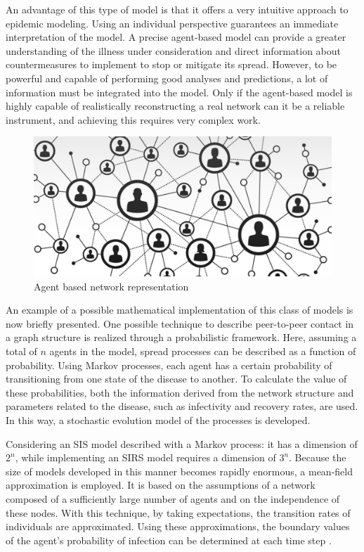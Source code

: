 An advantage of this type of model is that it offers a very intuitive approach to epidemic modeling. Using an individual perspective guarantees an immediate interpretation of the model. A precise agent-based model can provide a greater understanding of the illness under consideration and direct information about countermeasures to implement to stop or mitigate its spread. However, to be powerful and capable of performing good analyses and predictions, a lot of information must be integrated into the model. Only if the agent-based model is highly capable of realistically reconstructing a real network can it be a reliable instrument, and achieving this requires very complex work.
\begin{figure}
	\centering
	\includegraphics[width=0.5\linewidth]{0_introduction/images_introduction/agent_based}
	\caption[Agent based network representation]{Agent based network representation}
	\label{fig:agentbased}
\end{figure}


An example of a possible mathematical implementation of this class of models is now briefly presented. One possible technique to describe peer-to-peer contact in a graph structure is realized through a probabilistic framework. Here, assuming a total of $n$ agents in the model, spread processes can be described as a function of probability. Using Markov processes, each agent has a certain probability of transitioning from one state of the disease to another. To calculate the value of these probabilities, both the information derived from the network structure and parameters related to the disease, such as infectivity and recovery rates, are used. In this way, a stochastic evolution model of the processes is developed.

Considering an SIS model described with a Markov process: it has a dimension of $2^n$, while implementing an SIRS model requires a dimension of $3^n$. Because the size of models developed in this manner becomes rapidly enormous, a mean-field approximation is employed. It is based on the assumptions of a network composed of a sufficiently large number of agents and on the independence of these nodes. With this technique, by taking expectations, the transition rates of individuals are approximated. Using these approximations, the boundary values of the agent's probability of infection can be determined at each time step \cite{Hernandez_Vargas_2022}.

